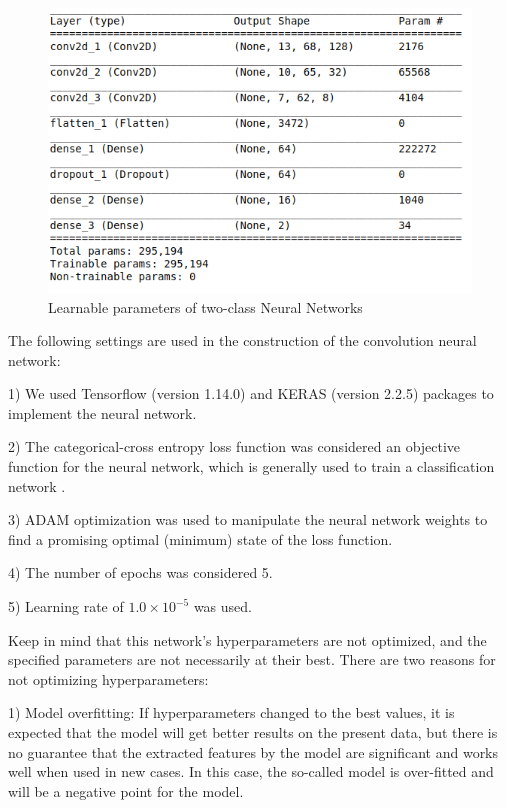 \documentclass{bmcart}
\begin{document}
\begin{figure}[!h]
	\centering
	\includegraphics[scale=0.65]{ModelSelection/modelparameters.png}
	\caption{Learnable parameters of two-class Neural Networks}
	\label{paramNumber1}
\end{figure}

The following settings are used in the construction of the convolution neural network:

1) We used Tensorflow \cite{abadi2016tensorflow} (version 1.14.0) and KERAS \cite{chollet2015keras} (version 2.2.5) packages to implement the neural network.

2) The categorical-cross entropy loss function was considered an objective function for the neural network, which is generally used to train a classification network \cite{ghosal1997your, toda2012research, seen20121}.

3) ADAM optimization \cite{kingma2014adam} was used to manipulate the neural network weights to find a promising optimal (minimum) state of the loss function.

4) The number of epochs was considered 5.

5) Learning rate of $1.0 \times 10^{-5}$ was used.

Keep in mind that this network's hyperparameters are not optimized, and the specified parameters are not necessarily at their best. There are two reasons for not optimizing hyperparameters:

1) Model overfitting: If hyperparameters changed to the best values, it is expected that the model will get better results on the present data, but there is no guarantee that the extracted features by the model are significant and works well when used in new cases. In this case, the so-called model is over-fitted and will be a negative point for the model.
\end{document}
